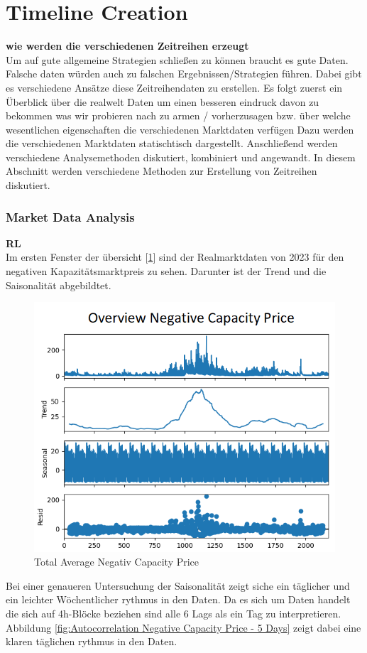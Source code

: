 
\section{Timeline Creation}
\textbf{wie werden die verschiedenen Zeitreihen erzeugt}\\
Um auf gute allgemeine Strategien schließen zu können braucht es gute Daten. Falsche daten würden auch zu falschen Ergebnissen/Strategien führen.
Dabei gibt es verschiedene Ansätze diese Zeitreihendaten zu erstellen. Es folgt zuerst ein Überblick über die realwelt Daten um einen besseren eindruck
davon zu bekommen was wir probieren nach zu armen / vorherzusagen bzw. über welche wesentlichen eigenschaften die verschiedenen Marktdaten verfügen
Dazu werden die verschiedenen Marktdaten statischtisch dargestellt.
Anschließend werden verschiedene Analysemethoden diskutiert, kombiniert und angewandt.
In diesem Abschnitt werden verschiedene Methoden zur Erstellung von Zeitreihen diskutiert.
\subsubsection{Market Data Analysis}
\textbf{RL}\\
Im ersten Fenster der übersicht [\ref{fig:Overview Average Negativ Capacity Price}] sind der Realmarktdaten von 2023 für den negativen Kapazitätsmarktpreis zu sehen.
Darunter ist der Trend und die Saisonalität abgebildtet.

\begin{figure}[!h]
	\includegraphics[width=0.7\linewidth]{pictures/capacityData_overview.png}
	\caption{Total Average Negativ Capacity Price}
	\label{fig:Overview Average Negativ Capacity Price}
\end{figure}

Bei einer genaueren Untersuchung der Saisonalität zeigt siche ein täglicher und ein leichter Wöchentlicher rythmus in den Daten.
Da es sich um Daten handelt die sich auf 4h-Blöcke beziehen sind alle 6 Lags als ein Tag zu interpretieren.
Abbildung \ref{fig:Autocorrelation Negative Capacity Price - 5 Days} zeigt dabei eine klaren täglichen rythmus in den Daten.

